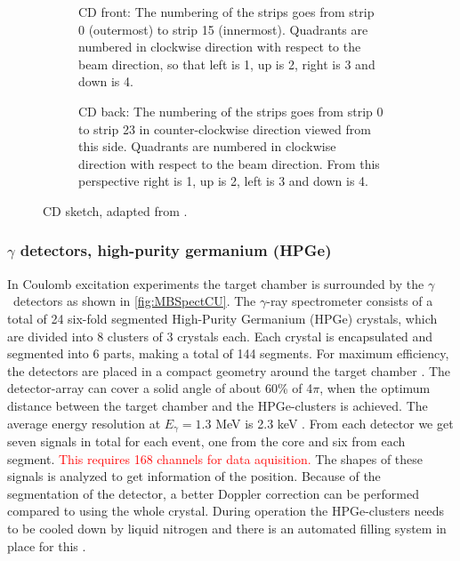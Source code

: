 \documentclass[twoside,english]{uiofysmaster/uiofysmaster}
\newcommand{\ga}{$\gamma$}
\begin{document}
\begin{figure}
	\centering
	\begin{subfigure}{\textwidth}
		
		\caption{CD front: The numbering of the strips goes from strip 0 (outermost) to strip 15 (innermost). Quadrants are numbered in clockwise direction with respect to the beam direction, so that left is 1, up is 2, right is 3 and down is 4.}
		\label{fig:CD-F}
	\end{subfigure}
	\begin{subfigure}{\textwidth}
		
		\caption{CD back: The numbering of the strips goes from strip 0 to strip 23 in counter-clockwise direction viewed from this side. Quadrants are numbered in clockwise direction with respect to the beam direction. From this perspective right is 1, up is 2, left is 3 and down is 4.}
		\label{fig:CD-B}
	\end{subfigure}
	\caption{CD sketch, adapted from \cite{NWarr-CD}.}
	\label{fig:CD-FB}
\end{figure}


\subsubsection{\texorpdfstring{$\gamma$}{Gamma} detectors, high-purity germanium (HPGe)}
In Coulomb excitation experiments the target chamber is surrounded by the \ga\ detectors as shown in \autoref{fig:MBSpectCU}. The \ga-ray spectrometer consists of a total of 24 six-fold segmented High-Purity Germanium (HPGe) crystals, which are divided into 8 clusters of 3 crystals each. Each crystal is encapsulated and segmented into 6 parts, making a total of 144 segments. For maximum efficiency, the detectors are placed in a compact geometry around the target chamber \cite{NWarr-HPGe, MB-spect}. The detector-array can cover a solid angle of about 60\% of 4$\pi$, when the optimum distance between the target chamber and the HPGe-clusters is achieved. The average energy resolution at $E_\gamma = 1.3$ MeV is 2.3 keV \cite{Butler2017}. From each detector we get seven signals in total for each event, one from the core and six from each segment. \textcolor{red}{This requires 168 channels for data aquisition.} The shapes of these signals is analyzed to get information of the position. Because of the segmentation of the detector, a better Doppler correction can be performed compared to using the whole crystal. During operation the HPGe-clusters needs to be cooled down by liquid nitrogen and there is an automated filling system in place for this \cite{NWarr-HPGe}. 
\end{document}
